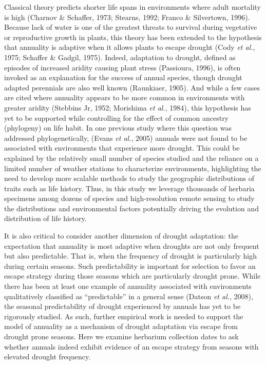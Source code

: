 \documentclass[man,floatsintext]{apa6}
\theoremstyle{definition}
\theoremstyle{definition}
\theoremstyle{definition}
\theoremstyle{remark}
\begin{document}
Classical theory predicts shorter life spans in environments where adult
mortality is high (Charnov \& Schaffer, 1973; Stearns, 1992; Franco \&
Silvertown, 1996). Because lack of water is one of the greatest threats
to survival during vegetative or reproductive growth in plants, this
theory has been extended to the hypothesis that annuality is adaptive
when it allows plants to escape drought (Cody \emph{et al.}, 1975;
Schaffer \& Gadgil, 1975). Indeed, adaptation to drought, defined as
episodes of increased aridity causing plant stress (Passioura, 1996), is
often invoked as an explanation for the success of annual species,
though drought adapted perennials are also well known (Raunkiaer, 1905).
And while a few cases are cited where annuality appears to be more
common in environments with greater aridity (Stebbins Jr, 1952;
Morishima \emph{et al.}, 1984), this hypothesis has yet to be supported
while controlling for the effect of common ancestry (phylogeny) on life
habit. In one previous study where this question was addressed
phylogenetically, (Evans \emph{et al.}, 2005) annuals were not found to
be associated with environments that experience more drought. This could
be explained by the relatively small number of species studied and the
reliance on a limited number of weather stations to characterize
environments, highlighting the need to develop more scalable methods to
study the geographic distributions of traits such as life history. Thus,
in this study we leverage thousands of herbaria specimens among dozens
of species and high-resolution remote sensing to study the distributions
and environmental factors potentially driving the evolution and
distribution of life history.

It is also critical to consider another dimension of drought adaptation:
the expectation that annuality is most adaptive when droughts are not
only frequent but also predictable. That is, when the frequency of
drought is particularly high during certain seasons. Such predictability
is important for selection to favor an escape strategy during those
seasons which are particularly drought prone. While there has been at
least one example of annuality associated with environments
qualitatively classified as \enquote{predictable} in a general sense
(Datson \emph{et al.}, 2008), the seasonal predictability of drought
experienced by annuals has yet to be rigorously studied. As such,
further empirical work is needed to support the model of annuality as a
mechanism of drought adaptation via escape from drought prone seasons.
Here we examine herbarium collection dates to ask whether annuals indeed
exhibit evidence of an escape strategy from seasons with elevated
drought frequency.
\end{document}
